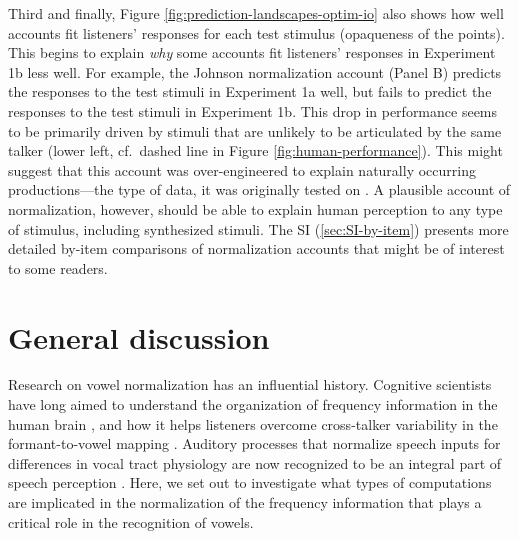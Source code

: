 \documentclass[preprint]{JASA}
\begin{document}
Third and finally, Figure \ref{fig:prediction-landscapes-optim-io} also shows how well accounts fit listeners' responses for each test stimulus (opaqueness of the points). This begins to explain \emph{why} some accounts fit listeners' responses in Experiment 1b less well. For example, the Johnson normalization account (Panel B) predicts the responses to the test stimuli in Experiment 1a well, but fails to predict the responses to the test stimuli in Experiment 1b. This drop in performance seems to be primarily driven by stimuli that are unlikely to be articulated by the same talker (lower left, cf.~dashed line in Figure \ref{fig:human-performance}). This might suggest that this account was over-engineered to explain naturally occurring productions---the type of data, it was originally tested on \citep{johnson2020}. A plausible account of normalization, however, should be able to explain human perception to any type of stimulus, including synthesized stimuli. The SI (\ref{sec:SI-by-item}) presents more detailed by-item comparisons of normalization accounts that might be of interest to some readers.

\section{General discussion}\label{sec:G-D}

Research on vowel normalization has an influential history. Cognitive scientists have long aimed to understand the organization of frequency information in the human brain \citep{stevens-volkmann1940, siegel1965}, and how it helps listeners overcome cross-talker variability in the formant-to-vowel mapping \citep[e.g.,][]{joos1948, fant1975, nordstrom-lindblom1975}. Auditory processes that normalize speech inputs for differences in vocal tract physiology are now recognized to be an integral part of speech perception \citep{mcmurray-jongman2011, johnson-sjerps2021, xie2023}. Here, we set out to investigate what types of computations are implicated in the normalization of the frequency information that plays a critical role in the recognition of vowels.
\end{document}
